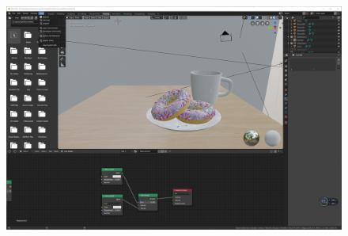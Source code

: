 \documentclass[logo,reportComp]{thesis}
\begin{document}
\begin{figure}[H]
\centering
\includegraphics[width=\linewidth]{fig/v9.png}
\end{figure}
\end{document}
